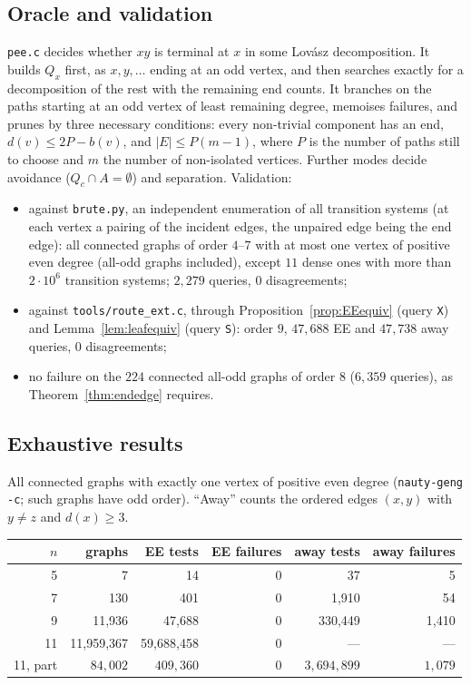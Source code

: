\documentclass[11pt]{amsart}
\theoremstyle{definition}
\begin{document}
\subsection*{Oracle and validation}
\texttt{pee.c} decides whether $xy$ is terminal at $x$ in some Lov\'asz decomposition. It builds $Q_x$
first, as $x,y,\dots$ ending at an odd vertex, and then searches exactly for a decomposition of the rest
with the remaining end counts. It branches on the paths starting at an odd vertex of least remaining
degree, memoises failures, and prunes by three necessary conditions: every non-trivial component has an
end, $d(v)\le2P-b(v)$, and $|E|\le P(m-1)$, where $P$ is the number of paths still to choose and $m$ the
number of non-isolated vertices. Further modes decide avoidance
($Q_c\cap A=\emptyset$) and separation. Validation:
\begin{itemize}
\item against \texttt{brute.py}, an independent enumeration of all transition systems (at each
vertex a pairing of the incident edges, the unpaired edge being the end edge): all connected graphs of
order $4$--$7$ with at most one vertex of positive even degree (all-odd graphs included), except $11$
dense ones with more than $2\cdot10^6$ transition systems; $2{,}279$ queries, $0$ disagreements;
\item against \texttt{tools/route\_ext.c}, through Proposition~\ref{prop:EEequiv} (query \texttt{X}) and
Lemma~\ref{lem:leafequiv} (query \texttt{S}): order $9$, $47{,}688$ EE and $47{,}738$ away queries,
$0$ disagreements;
\item no failure on the $224$ connected all-odd graphs of order $8$ ($6{,}359$ queries), as
Theorem~\ref{thm:endedge} requires.
\end{itemize}

\subsection*{Exhaustive results}
All connected graphs with exactly one vertex of positive even degree (\texttt{nauty-geng -c}; such
graphs have odd order). ``Away'' counts the ordered edges $(x,y)$ with $y\ne z$ and $d(x)\ge3$.

\begin{center}
\begin{tabular}{rrrrrr}
\toprule
$n$ & graphs & EE tests & EE failures & away tests & away failures \\
\midrule
5 & 7 & 14 & 0 & 37 & 5 \\
7 & 130 & 401 & 0 & 1{,}910 & 54 \\
9 & 11{,}936 & 47{,}688 & 0 & 330{,}449 & 1{,}410 \\
11 & 11{,}959{,}367 & 59{,}688{,}458 & 0 & --- & --- \\
11, part & $84{,}002$ & $409{,}360$ & 0 & $3{,}694{,}899$ & $1{,}079$ \\
\bottomrule
\end{tabular}
\end{center}
\end{document}
